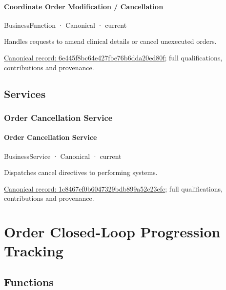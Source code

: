\paragraph{Coordinate Order Modification / Cancellation}

\label{element:6e445f8bc64e427fbe76b6dda20ed80f}
{\small BusinessFunction · Canonical · current}\par

Handles requests to amend clinical details or cancel unexecuted orders.


{\footnotesize \href{../../../../continuum/business/business-function/6e445f8bc64e427fbe76b6dda20ed80f.md}{Canonical record: 6e445f8bc64e427fbe76b6dda20ed80f}; full qualifications, contributions and provenance.}\par
\subsection{Services}

\subsubsection{Order Cancellation Service}

\paragraph{Order Cancellation Service}

\label{element:1c8467ef0b6047329bdb899a52c23efc}
{\small BusinessService · Canonical · current}\par

Dispatches cancel directives to performing systems.


{\footnotesize \href{../../../../continuum/business/business-service/1c8467ef0b6047329bdb899a52c23efc.md}{Canonical record: 1c8467ef0b6047329bdb899a52c23efc}; full qualifications, contributions and provenance.}\par
\section{Order Closed-Loop Progression Tracking}

\subsection{Functions}


